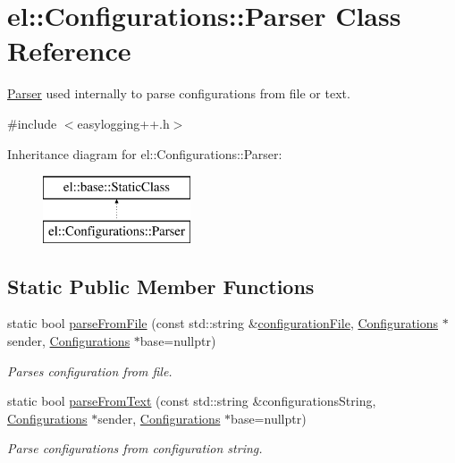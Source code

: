 \hypertarget{classel_1_1_configurations_1_1_parser}{}\section{el\+:\+:Configurations\+:\+:Parser Class Reference}
\label{classel_1_1_configurations_1_1_parser}


\hyperlink{classel_1_1_configurations_1_1_parser}{Parser} used internally to parse configurations from file or text.  




{\ttfamily \#include $<$easylogging++.\+h$>$}

Inheritance diagram for el\+:\+:Configurations\+:\+:Parser\+:\begin{figure}[H]
\begin{center}
\leavevmode
\includegraphics[height=2.000000cm]{classel_1_1_configurations_1_1_parser}
\end{center}
\end{figure}
\subsection*{Static Public Member Functions}
\begin{DoxyCompactItemize}
\item 
static bool \hyperlink{classel_1_1_configurations_1_1_parser_a45def5007bf368c4d2a505af58cd94c2}{parse\+From\+File} (const std\+::string \&\hyperlink{classel_1_1_configurations_a18df64bb5cd97bee672160290133141c}{configuration\+File}, \hyperlink{classel_1_1_configurations}{Configurations} $\ast$sender, \hyperlink{classel_1_1_configurations}{Configurations} $\ast$base=nullptr)
\begin{DoxyCompactList}\small\item\em Parses configuration from file. \end{DoxyCompactList}\item 
static bool \hyperlink{classel_1_1_configurations_1_1_parser_a39ec1b06f673e8155a83d66e08229129}{parse\+From\+Text} (const std\+::string \&configurations\+String, \hyperlink{classel_1_1_configurations}{Configurations} $\ast$sender, \hyperlink{classel_1_1_configurations}{Configurations} $\ast$base=nullptr)
\begin{DoxyCompactList}\small\item\em Parse configurations from configuration string. \end{DoxyCompactList}\end{DoxyCompactItemize}

